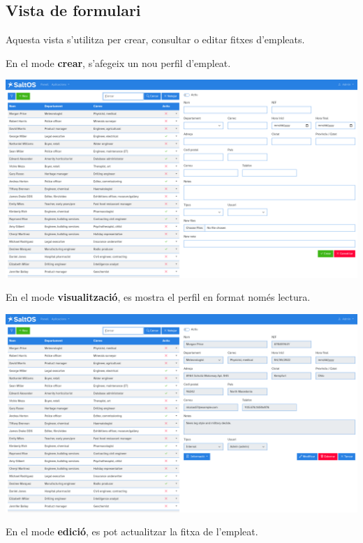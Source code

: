 \documentclass[a4paper]{article}
\begin{document}
\hypertarget{toc109}{}
\subsection{Vista de formulari}

Aquesta vista s'utilitza per crear, consultar o editar fitxes d'empleats.

En el mode \textbf{crear}, s'afegeix un nou perfil d'empleat.

\begin{center}\includegraphics[width=1\textwidth]{../ujest/snaps/test-screenshots-js-screenshots-hr-employees-create-ca-es-1-snap.png}\end{center}

En el mode \textbf{visualització}, es mostra el perfil en format només lectura.

\begin{center}\includegraphics[width=1\textwidth]{../ujest/snaps/test-screenshots-js-screenshots-hr-employees-view-100-ca-es-1-snap.png}\end{center}

En el mode \textbf{edició}, es pot actualitzar la fitxa de l'empleat.
\end{document}
